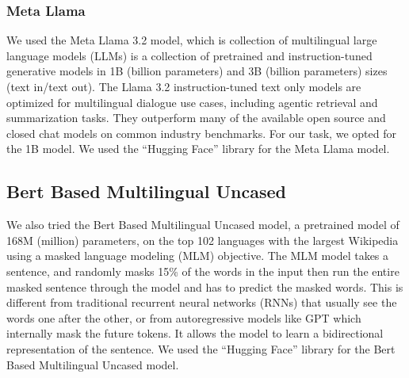 \subsubsection{Meta Llama}
We used the Meta Llama 3.2 model, which is collection of multilingual large language models (LLMs) is a collection of pretrained and instruction-tuned generative models in 1B (billion parameters) and 3B (billion parameters) sizes (text in/text out). The Llama 3.2 instruction-tuned text only models are optimized for multilingual dialogue use cases, including agentic retrieval and summarization tasks. They outperform many of the available open source and closed chat models on common industry benchmarks. For our task, we opted for the 1B model. We used the ``Hugging Face'' library for the Meta Llama model. 

\subsection{Bert Based Multilingual Uncased}
We also tried the Bert Based Multilingual Uncased model, a pretrained model of 168M (million) parameters, on the top 102 languages with the largest Wikipedia using a masked language modeling (MLM) objective. The MLM model takes a sentence, and randomly masks 15\% of the words in the input then run the entire masked sentence through the model and has to predict the masked words. This is different from traditional recurrent neural networks (RNNs) that usually see the words one after the other, or from autoregressive models like GPT which internally mask the future tokens. It allows the model to learn a bidirectional representation of the sentence. We used the ``Hugging Face'' library for the Bert Based Multilingual Uncased model.